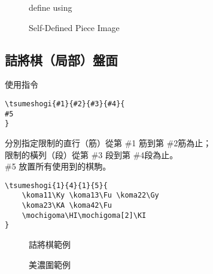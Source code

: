 \documentclass[a4paper, 10pt,]{article}
\begin{document}
\begin{figure}[h]
  \begin{minipage}[h]{0.5\linewidth}
    \centering
    \gazouka
    \caption{define using \texttt{\gazouka}\\}
    \label{fig:side:a}
  \end{minipage}%
  \begin{minipage}[h]{0.5\linewidth}
    \centering
    \def\komapath{Portella}
  \gazouka
    \caption{Self-Defined Piece Image}
    \label{fig:side:b}
  \end{minipage}
\end{figure}



\subsection{詰將棋（局部）盤面}
使用指令
\begin{lstlisting}
\tsumeshogi{#1}{#2}{#3}{#4}{
#5
}
\end{lstlisting}
分別指定限制的直行（筋）從第 \#1 筋到第 \#2筋為止；\\
限制的橫列（段）從第 \#3 段到第 \#4段為止。\\
\#5 放置所有使用到的棋駒。
\begin{lstlisting}
\tsumeshogi{1}{4}{1}{5}{
    \koma11\Ky \koma13\Fu \koma22\Gy
    \koma23\KA \koma42\Fu
    \mochigoma\HI\mochigoma[2]\KI
}
\end{lstlisting}

\begin{figure}[h]
  \begin{minipage}[h]{0.5\linewidth}
    \centering
    \caption{詰將棋範例}
    \label{fig:side:a}
  \end{minipage}%
  \begin{minipage}[h]{0.5\linewidth}
    \centering
    \caption{美濃圍範例}
    \label{fig:side:b}
  \end{minipage}
\end{figure}
\end{document}
